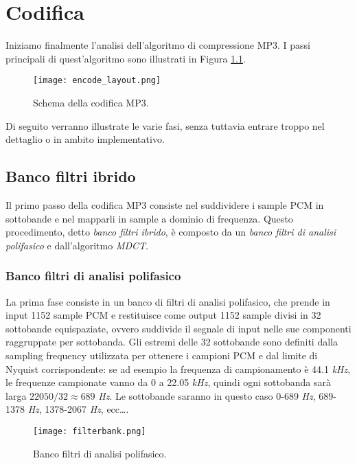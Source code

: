 \chapter{Codifica} \label{chap:codifica}
	
	Iniziamo finalmente l'analisi dell'algoritmo di compressione MP3. I passi principali di quest'algoritmo sono illustrati in Figura \ref{fig:encode_layout}.\\
	
	\begin{figure}[h!]
		\centering
			\texttt{[image: encode\_layout.png]}
		\caption{Schema della codifica MP3.}
		\label{fig:encode_layout}
	\end{figure}
	
	Di seguito verranno illustrate le varie fasi, senza tuttavia entrare troppo nel dettaglio o in ambito implementativo.
	
	\section{Banco filtri ibrido}
		
		Il primo passo della codifica MP3 consiste nel suddividere i sample PCM in sottobande e nel mapparli in sample a dominio di frequenza. Questo procedimento, detto \textit{banco filtri ibrido}, è composto da un \textit{banco filtri di analisi polifasico} e dall'algoritmo \textit{MDCT}.
		
		\subsection{Banco filtri di analisi polifasico} \label{subsec:banco_filtri_analisi_polifasico}
			
			La prima fase consiste in un banco di filtri di analisi polifasico, che prende in input 1152 sample PCM e restituisce come output 1152 sample divisi in 32 sottobande equispaziate, ovvero suddivide il segnale di input nelle sue componenti raggruppate per sottobanda. Gli estremi delle 32 sottobande sono definiti dalla sampling frequency utilizzata per ottenere i campioni PCM e dal limite di Nyquist corrispondente: se ad esempio la frequenza di campionamento è 44.1 \textit{kHz}, le frequenze campionate vanno da 0 a 22.05 \textit{kHz}, quindi ogni sottobanda sarà larga $22050/32\approx 689$ \textit{Hz}. Le sottobande saranno in questo caso 0-689 \textit{Hz}, 689-1378 \textit{Hz}, 1378-2067 \textit{Hz}, ecc\dots.
			
			\begin{wrapfigure}{r}{0.5\textwidth}
				\centering
					\texttt{[image: filterbank.png]}
				\caption{Banco filtri di analisi polifasico.}
				\label{fig:filterbank}
			\end{wrapfigure}
			
